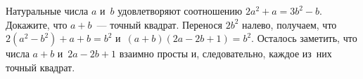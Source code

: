 \problem{}
Натуральные числа $a$ и~$b$ удовлетворяют соотношению $2 a^2 + a = 3 b^2 - b$.
Докажите, что $a + b$~--- точный квадрат.
\solution
Перенося $2 b^2$ налево, получаем, что
$2 (a^2 - b^2) + a + b = b^2$ и~$(a + b) (2 a - 2 b + 1) = b^2$.
Осталось заметить, что числа $a + b$ и~$2 a - 2 b + 1$ взаимно просты и,
следовательно, каждое из~них точный квадрат.
\endproblem
